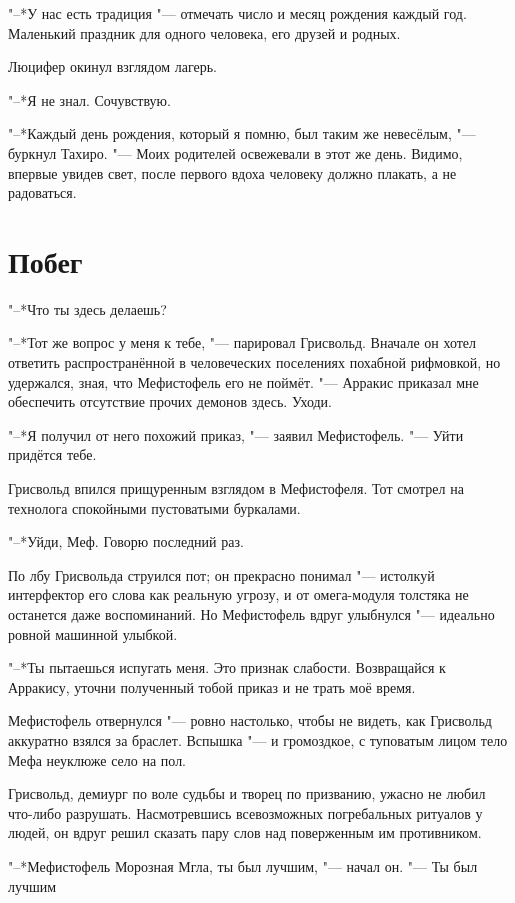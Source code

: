 \documentclass[a4paper,10pt]{book}
\newcommand{\ldotst}{\so{...}\xspace}
\begin{document}
"--*У нас есть традиция "--- отмечать число и месяц рождения каждый год. Маленький праздник для одного человека, его друзей и родных.

Люцифер окинул взглядом лагерь.

"--*Я не знал. Сочувствую.

"--*Каждый день рождения, который я помню, был таким же невесёлым, "--- буркнул Тахиро. "--- Моих родителей освежевали в этот же день. Видимо, впервые увидев свет, после первого вдоха человеку должно плакать, а не радоваться.

\section{Побег}

"--*Что ты здесь делаешь?

"--*Тот же вопрос у меня к тебе, "--- парировал Грисвольд. Вначале он хотел 
ответить распространённой в человеческих поселениях
похабной рифмовкой, но удержался, зная, что Мефистофель его не поймёт. "--- 
Арракис приказал мне обеспечить отсутствие прочих 
демонов здесь.
Уходи.

"--*Я получил от него похожий приказ, "--- заявил Мефистофель. "--- Уйти 
придётся тебе.

Грисвольд впился прищуренным взглядом в Мефистофеля. Тот смотрел на технолога 
спокойными пустоватыми буркалами.

"--*Уйди, Меф. Говорю последний раз.

По лбу Грисвольда струился пот; он прекрасно понимал "--- истолкуй интерфектор 
его слова как реальную угрозу, и от омега-модуля толстяка не останется даже 
воспоминаний. Но Мефистофель вдруг улыбнулся "--- идеально ровной машинной 
улыбкой.

"--*Ты пытаешься испугать меня. Это признак слабости. Возвращайся к Арракису, 
уточни полученный тобой приказ и не трать моё время.

Мефистофель отвернулся "--- ровно настолько, чтобы не видеть, как Грисвольд 
аккуратно взялся за браслет. Вспышка "--- и громоздкое, с туповатым лицом тело 
Мефа неуклюже село на пол.

Грисвольд, демиург по воле судьбы и творец по призванию, ужасно не любил 
что-либо 
разрушать. Насмотревшись всевозможных погребальных ритуалов у людей, он вдруг 
решил сказать пару слов над поверженным им противником.

"--*Мефистофель Морозная Мгла, ты был лучшим, "--- начал он. "--- Ты был 
лучшим\ldotst
\end{document}
